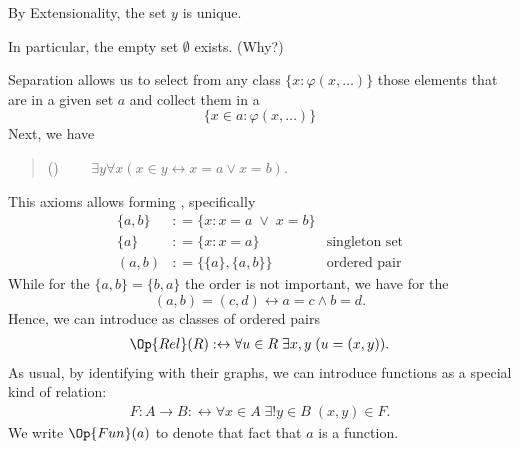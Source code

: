 \documentclass[letterpaper,10pt,english]{jupyterBook}
\begin{document}
\sphinxAtStartPar
By Extensionality, the set \(y\) is unique.

\begin{sphinxShadowBox}
\sphinxstylesidebartitle{}

\sphinxAtStartPar
In particular, the empty set \(\emptyset\) exists. (Why?)
\end{sphinxShadowBox}

\sphinxAtStartPar
Separation allows us to select from any class \(\{x \colon \varphi(x,\ldots)\}\) those elements that are in a given set \(a\) and collect them in a 
\begin{equation*}
    \{x \in a \colon \varphi(x,\ldots)\}
\end{equation*}
\sphinxAtStartPar
Next, we have
\begin{quote}

\sphinxAtStartPar
() \( \qquad \exists y \forall x( x \in y \leftrightarrow  x = a \vee x = b)\).
\end{quote}

\sphinxAtStartPar
This axioms allows forming , specifically
\begin{align*}
    \{a,b\} & : =  \{x\colon x=a \; \vee \; x=b \} &    \\
    \{a\} &: = \{x\colon x=a  \} &    \text{singleton set}\\
    (a,b) &: =  \{\{a\},\{a,b\}\} &    \text{ordered pair}
\end{align*}
\sphinxAtStartPar
While for the  \(\{a,b\} = \{b,a\}\) the order is not important, we have for the 
\begin{equation*}
(a,b) = (c,d) \leftrightarrow a = c \wedge b = d.
\end{equation*}
\sphinxAtStartPar
Hence, we can introduce  as classes of ordered pairs
\begin{gather*}
    \Op{Rel}(R) :\leftrightarrow  \forall u \in R \; \exists x,y  \; (u =(x,y)).
\end{gather*}
\sphinxAtStartPar
As usual, by identifying  with their graphs, we can introduce functions as a special kind of relation:
\begin{gather*}
F: A \to B :\leftrightarrow  \forall x \in A \; \exists ! y \in B \; (x,y) \in F.
\end{gather*}
\sphinxAtStartPar
We write \(\Op{Fun}(a)\) to denote that fact that \(a\) is a function.
\end{document}
